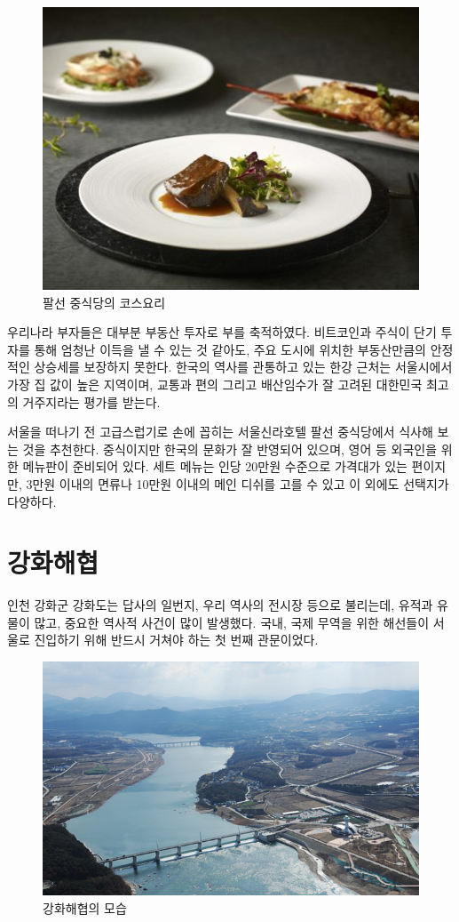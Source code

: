 \begin{figure}[ht]
    \centering
    \includegraphics[width=.6\textwidth]{e_img/ww_-007.jpg}
    \caption{팔선 중식당의 코스요리}
    \label{fig:haryu8}
\end{figure}


우리나라 부자들은 대부분 부동산 투자로 부를 축적하였다. 비트코인과 주식이 단기
투자를 통해 엄청난 이득을 낼 수 있는 것 같아도, 주요 도시에 위치한 부동산만큼의 안정
적인 상승세를 보장하지 못한다. 한국의 역사를 관통하고 있는 한강 근처는 서울시에서 
가장 집 값이 높은 지역이며, 교통과 편의 그리고 배산임수가 잘 고려된 대한민국 최고의 
거주지라는 평가를 받는다.

서울을 떠나기 전 고급스럽기로 손에 꼽히는 서울신라호텔 팔선 중식당에서 식사해
보는 것을 추천한다. 중식이지만 한국의 문화가 잘 반영되어 있으며, 영어 등 외국인을 위
한 메뉴판이 준비되어 있다. 세트 메뉴는 인당 20만원 수준으로 가격대가 있는 편이지만,
3만원 이내의 면류나 10만원 이내의 메인 디쉬를 고를 수 있고 이 외에도 선택지가 다양하다.



\section{강화해협}


인천 강화군 강화도는 답사의 일번지, 우리 역사의 전시장 등으로 불리는데, 유적과
유물이 많고, 중요한 역사적 사건이 많이 발생했다. 국내, 국제 무역을 위한 해선들이 
서울로 진입하기 위해 반드시 거쳐야 하는 첫 번째 관문이었다.

\begin{figure}[ht]
    \centering
    \includegraphics[width=.6\textwidth]{e_img/ww_-008.jpg}
    \caption{강화해협의 모습}
    \label{fig:haryu9}
\end{figure}


